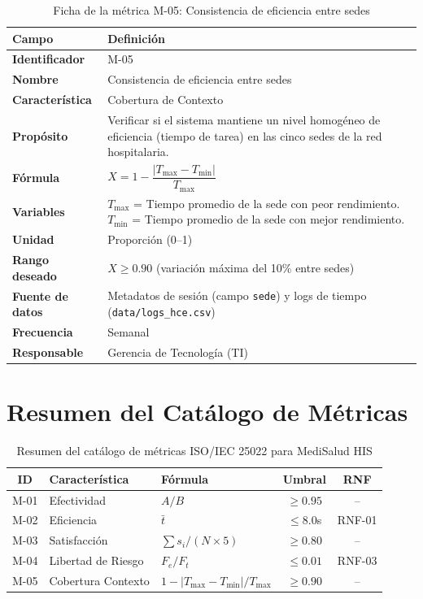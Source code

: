 \documentclass[12pt,a4paper]{article}
\begin{document}
\begin{table}[H]
\centering
\caption{Ficha de la m\'etrica M-05: Consistencia de eficiencia entre sedes}
\begin{tabularx}{\textwidth}{l X}
\toprule
\textbf{Campo} & \textbf{Definici\'on} \\
\midrule
\textbf{Identificador} & M-05 \\
\textbf{Nombre} & Consistencia de eficiencia entre sedes \\
\textbf{Caracter\'istica} & Cobertura de Contexto \\
\textbf{Prop\'osito} & Verificar si el sistema mantiene un nivel homog\'eneo de eficiencia (tiempo de tarea) en las cinco sedes de la red hospitalaria. \\
\textbf{F\'ormula} & $X = 1 - \dfrac{|T_{\max} - T_{\min}|}{T_{\max}}$ \\
\textbf{Variables} & $T_{\max}$ = Tiempo promedio de la sede con peor rendimiento. \newline $T_{\min}$ = Tiempo promedio de la sede con mejor rendimiento. \\
\textbf{Unidad} & Proporci\'on (0--1) \\
\textbf{Rango deseado} & $X \ge 0.90$ (variaci\'on m\'axima del 10\% entre sedes) \\
\textbf{Fuente de datos} & Metadatos de sesi\'on (campo \texttt{sede}) y logs de tiempo (\texttt{data/logs\_hce.csv}) \\
\textbf{Frecuencia} & Semanal \\
\textbf{Responsable} & Gerencia de Tecnolog\'ia (TI) \\
\bottomrule
\end{tabularx}
\end{table}

\section{Resumen del Cat\'alogo de M\'etricas}

\begin{table}[H]
\centering
\caption{Resumen del cat\'alogo de m\'etricas ISO/IEC 25022 para MediSalud HIS}
\begin{tabularx}{\textwidth}{c l l c c}
\toprule
\textbf{ID} & \textbf{Caracter\'istica} & \textbf{F\'ormula} & \textbf{Umbral} & \textbf{RNF} \\
\midrule
M-01 & Efectividad         & $A/B$                               & $\ge 0.95$ & -- \\
M-02 & Eficiencia          & $\bar{t}$                           & $\le 8.0$s & RNF-01 \\
M-03 & Satisfacci\'on       & $\sum s_i / (N \times 5)$           & $\ge 0.80$ & -- \\
M-04 & Libertad de Riesgo  & $F_e / F_t$                         & $\le 0.01$ & RNF-03 \\
M-05 & Cobertura Contexto  & $1 - |T_{\max}-T_{\min}|/T_{\max}$  & $\ge 0.90$ & -- \\
\bottomrule
\end{tabularx}
\end{table}
\end{document}
